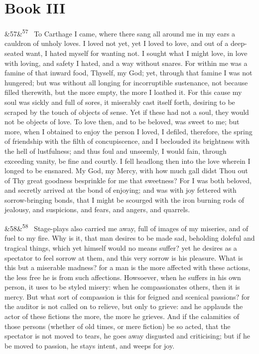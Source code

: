 \documentclass[12pt]{article}
\newcommand{\para}[1][]{\par\noindent\ifx&#1&\else\textsuperscript{\footnotesize #1}~\fi}
\begin{document}
\section*{Book III}

\para[57] To Carthage I came, where there sang all around me in my ears a cauldron of unholy loves. I loved not yet, yet I loved to love, and out of a deep-seated want, I hated myself for wanting not. I sought what I might love, in love with loving, and safety I hated, and a way without snares. For within me was a famine of that inward food, Thyself, my God; yet, through that famine I was not hungered; but was without all longing for incorruptible sustenance, not because filled therewith, but the more empty, the more I loathed it. For this cause my soul was sickly and full of sores, it miserably cast itself forth, desiring to be scraped by the touch of objects of sense. Yet if these had not a soul, they would not be objects of love. To love then, and to be beloved, was sweet to me; but more, when I obtained to enjoy the person I loved, I defiled, therefore, the spring of friendship with the filth of concupiscence, and I beclouded its brightness with the hell of lustfulness; and thus foul and unseemly, I would fain, through exceeding vanity, be fine and courtly. I fell headlong then into the love wherein I longed to be ensnared. My God, my Mercy, with how much gall didst Thou out of Thy great goodness besprinkle for me that sweetness? For I was both beloved, and secretly arrived at the bond of enjoying; and was with joy fettered with sorrow-bringing bonds, that I might be scourged with the iron burning rods of jealousy, and suspicions, and fears, and angers, and quarrels.

\para[58] Stage-plays also carried me away, full of images of my miseries, and of fuel to my fire. Why is it, that man desires to be made sad, beholding doleful and tragical things, which yet himself would no means suffer? yet he desires as a spectator to feel sorrow at them, and this very sorrow is his pleasure. What is this but a miserable madness? for a man is the more affected with these actions, the less free he is from such affections. Howsoever, when he suffers in his own person, it uses to be styled misery: when he compassionates others, then it is mercy. But what sort of compassion is this for feigned and scenical passions? for the auditor is not called on to relieve, but only to grieve: and he applauds the actor of these fictions the more, the more he grieves. And if the calamities of those persons (whether of old times, or mere fiction) be so acted, that the spectator is not moved to tears, he goes away disgusted and criticising; but if he be moved to passion, he stays intent, and weeps for joy.
\end{document}
